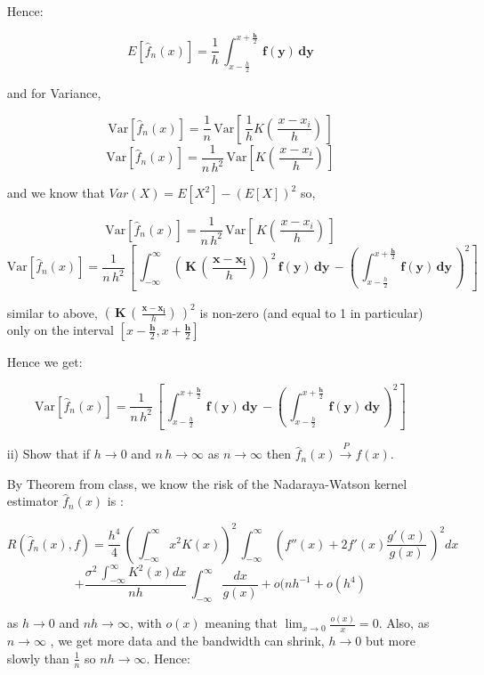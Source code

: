 \documentclass[11pt]{report}
\begin{document}
\begin{itemize}
Hence:

$$ E\left[\widehat{f}_n(x) \right] = \frac{1}{h}\,\int_{x-\frac{h}{2}}^{x +\frac{\mathbf{h}}{2}} \,\mathbf{f(y)}\,\mathbf{dy} $$

and for Variance,

$$\text{Var}\left[\widehat{f}_n(x)\right] =  \frac{1}{n}\,\text{Var}\left[\,\frac{1}{h}K(\,\frac{x-x_i}{h})\,\right]$$
$$\text{Var}\left[\widehat{f}_n(x)\right] =  \frac{1}{n\,h^{2}}\,\text{Var}\left[K(\,\frac{x-x_i}{h})\,\right]$$

and we know that $ Var(X) = E[X^{2}] - (E[X])^2 $ so,

$$\text{Var}\left[\widehat{f}_n(x)\right] =  \frac{1}{n\,h^{2}}\,\text{Var}\left[\,K(\,\frac{x-x_i}{h})\,\right]$$
$$\text{Var}\left[\widehat{f}_n(x)\right] =  \frac{1}{n\,h^{2}}\,\left[\,\int_{-\infty}^{\infty} \,\left(\,\mathbf{K}\,\left(\,\frac{\mathbf{x - x_i}}{h}\right)\,\right)^{2}\,\mathbf{f(y)}\,\mathbf{dy}\, - \left(\,\int_{x-\frac{h}{2}}^{x +\frac{\mathbf{h}}{2}} \,\mathbf{f(y)}\,\mathbf{dy}\,\right)^{2}\right]$$

similar to above, $\left(\,\mathbf{K}\,\left(\,\frac{\mathbf{x - x_i}}{h}\right)\,\right)^{2}$ is non-zero (and equal to 1 in particular) only on the interval $[x -\frac{\mathbf{h}}{2},x +\frac{\mathbf{h}}{2}]$

Hence we get:

$$\text{Var}\left[\widehat{f}_n(x)\right] =  \frac{1}{n\,h^{2}}\,\left[\,\int_{x-\frac{h}{2}}^{x +\frac{\mathbf{h}}{2}}\,\mathbf{f(y)}\,\mathbf{dy}\, - \left(\,\int_{x-\frac{h}{2}}^{x +\frac{\mathbf{h}}{2}}\,\mathbf{f(y)}\,\mathbf{dy}\,\right)^{2}\right]$$

\item[ii) ] Show that if $h\rightarrow 0$ and $n\,h\rightarrow \infty$ as $n\rightarrow \infty$ then $\widehat{f}_n(x)\xrightarrow{P} f(x)$. 

By Theorem from class, we know the risk of the Nadaraya-Watson kernel estimator $\widehat{f}_n(x)$  is :

$$ R(\widehat{f}_n(x),f) = \frac{h^4}{4}\,\left(\,\int_{-\infty}^{\infty}x^2K(x)\right)^{2}\,\int_{-\infty}^{\infty}\,\left(f''(x) + 2f'(x)\frac{g'(x)}{g(x)}\,\right)^{2}dx $$
$$+ \frac{\sigma^{2}\,\int_{-\infty}^{\infty}K^{2}(x)dx}{nh}\,\int_{-\infty}^{\infty}\frac{dx}{g(x)} + o(nh^{-1} + o(h^{4}) $$

as $h \rightarrow 0$ and $nh \rightarrow \infty$, with $o(x)$ meaning that $ \lim_{x \to 0} \frac{o(x)}{x} = 0$. Also, as $n \rightarrow \infty$ , we get more data and the bandwidth can shrink, $h \rightarrow 0$ but more slowly than $\frac{1}{n}$ so $ nh \rightarrow \infty$. Hence:


\end{itemize}
\end{document}
